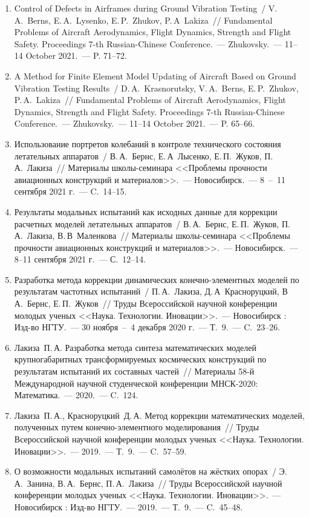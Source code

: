 \begin{enumerate}
	\item Control of Defects in Airframes during Ground Vibration Testing~/ V.\,A.~Berns, E.\,A.~Lysenko, E.\,P.~Zhukov, P.\,A~Lakiza~// Fundamental Problems of Aircraft Aerodynamics, Flight Dynamics, Strength and Flight Safety. Proceedings 7-th Russian-Chinese Conference.~--- Zhukovsky.~--- 11--14 October 2021.~--- P. 71--72.
	\item A Method for Finite Element Model Updating of Aircraft Based on Ground Vibration Testing Results~/ D.\,A.~Krasnorutsky, V.\,A.~Berns, E.\,P.~Zhukov, P.\,A.~Lakiza~// Fundamental Problems of Aircraft Aerodynamics, Flight Dynamics, Strength and Flight Safety. Proceedings 7-th Russian-Chinese Conference.~--- Zhukovsky.~--- 11--14 October 2021.~--- P. 65--66.
	\item Использование портретов колебаний в контроле технического состояния летательных аппаратов~/ В.\,А.~Бернс, Е.\,А~Лысенко, Е.\,П.~Жуков, П.\,А.~Лакиза~// Материалы школы-семинара <<Проблемы прочности авиационных конструкций и материалов>>.~--- Новосибирск.~--- 8~--~11 сентября 2021 г.~--- C.~14--15.
	\item Результаты модальных испытаний как исходных данные для коррекции расчетных моделей летательных аппаратов~/ В.\,А.~Бернс, Е.\,П.~Жуков, П.\,А.~Лакиза, В.\,В~Маленкова~// Материалы школы-семинара <<Проблемы прочности авиационных конструкций и материалов>>.~--- Новосибирск.~--- 8--11 сентября 2021 г.~--- С.~12--14.
	\item Разработка метода коррекции динамических конечно-элементных моделей по результатам частотных испытаний~/ П.\,А.~Лакиза, Д.\,А~Красноруцкий, В\,А.~Бернс, Е.\,П.~Жуков~// Труды Всероссийской научной конференции молодых ученых <<Наука. Технологии. Иновации>>.~--- Новосибирск : Изд-во НГТУ.~--- 30 ноября~--~4 декабря 2020 г.~--- Т.~9.~--- C.~23--26.
	\item Лакиза~П.\,А. Разработка метода синтеза математических моделей крупногабаритных трансформируемых космических конструкций по результатам испытаний их составных частей~// Материалы 58-й Международной научной студенческой конференции МНСК-2020: Математика.~--- 2020.~--- C.~124.
	\item Лакиза~П.\,А., Красноруцкий~Д.\,А. Метод коррекции математических моделей, полученных путем конечно-элементного моделирования~// Труды Всероссийской научной конференции молодых ученых <<Наука. Технологии. Иновации>>.~--- 2019.~--- Т.~9.~--- C.~57--59.
	\item О возможности модальных испытаний самолётов на жёстких опорах~/ Э.\,А.~Занина, В.\,А.~Бернс, П.\,А.~Лакиза~// Труды Всероссийской научной конференции молодых ученых <<Наука. Технологии. Иновации>>.~--- Новосибирск : Изд-во НГТУ.~--- 2019.~--- Т.~9.~--- C.~45--48.

\end{enumerate}
